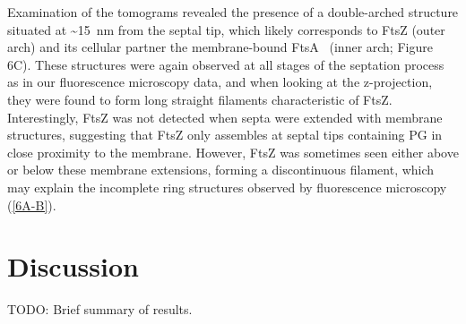 Examination of the tomograms revealed the presence of a double-arched structure situated at \sim\qty{15}{nm} from the septal tip, which likely corresponds to FtsZ (outer arch) and its cellular partner the membrane-bound FtsA~\cite{sextonSuperresolutionConfocalCryoCLEM2022} (inner arch; Figure 6C).
These structures were again observed at all stages of the septation process as in our fluorescence microscopy data, and when looking at the z-projection, they were found to form long straight filaments characteristic of FtsZ.
Interestingly, FtsZ was not detected when septa were extended with membrane structures, suggesting that FtsZ only assembles at septal tips containing PG in close proximity to the membrane.
However, FtsZ was sometimes seen either above or below these membrane extensions, forming a discontinuous filament, which may explain the incomplete ring structures observed by fluorescence microscopy (\autoref{6A-B}).

\section{Discussion}

TODO: Brief summary of results.

